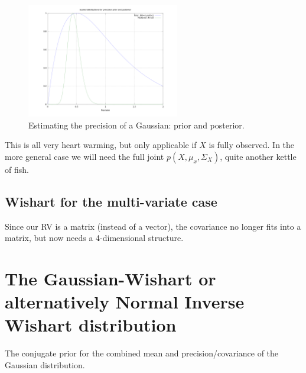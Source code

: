 \begin{figure}
\noindent \begin{centering}
\includegraphics[height=5cm]{precision_prior_and_posterior_1d}
\par\end{centering}

\caption{Estimating the precision of a Gaussian: prior and posterior.}
\label{fig:prec_prior_and_posterior_1d}
\end{figure}


This is all very heart warming, but only applicable if $X$ is fully
observed. In the more general case we will need the full joint $p(X,\mu_{x},\Sigma_{X})$,
quite another kettle of fish.


\subsection{Wishart for the multi-variate case}

Since our RV is a matrix (instead of a vector), the covariance no
longer fits into a matrix, but now needs a 4-dimensional structure.


\section{The Gaussian-Wishart or alternatively Normal Inverse Wishart distribution}

The conjugate prior for the combined mean and precision/covariance
of the Gaussian distribution.


